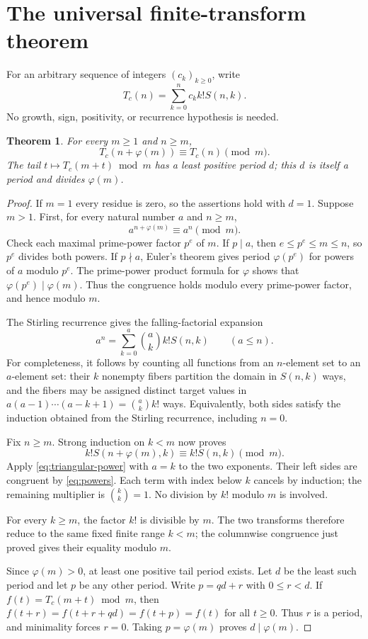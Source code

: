 \documentclass[11pt,a4paper]{article}
\newtheorem{theorem}{Theorem}[section]
\theoremstyle{remark}
\begin{document}
\section{The universal finite-transform theorem}
For an arbitrary sequence of integers $(c_k)_{k\ge0}$, write
\[
T_c(n)=\sum_{k=0}^n c_k k!S(n,k).
\]
No growth, sign, positivity, or recurrence hypothesis is needed.
\begin{theorem}\label{thm:period}
For every $m\ge1$ and $n\ge m$,
\[
T_c(n+\varphi(m))\equiv T_c(n)\pmod m.
\]
The tail $t\mapsto T_c(m+t)\bmod m$ has a least positive period $d$;
this $d$ is itself a period and divides $\varphi(m)$.
\end{theorem}
\begin{proof}
If $m=1$ every residue is zero, so the assertions hold with $d=1$.
Suppose $m>1$. First, for every natural number $a$ and $n\ge m$,
\begin{equation}\label{eq:powers}
a^{n+\varphi(m)}\equiv a^n\pmod m.
\end{equation}
Check each maximal prime-power factor $p^e$ of $m$. If $p\mid a$,
then $e\le p^e\le m\le n$, so $p^e$ divides both powers. If
$p\nmid a$, Euler's theorem gives period $\varphi(p^e)$ for powers
of $a$ modulo $p^e$. The prime-power product formula for $\varphi$
shows that $\varphi(p^e)\mid\varphi(m)$. Thus the congruence holds
modulo every prime-power factor, and hence modulo $m$.

The Stirling recurrence gives the falling-factorial expansion
\begin{equation}\label{eq:triangular-power}
a^n=\sum_{k=0}^{a}\binom ak k!S(n,k)\qquad(a\le n).
\end{equation}
For completeness, it follows by counting all functions from an
$n$-element set to an $a$-element set: their $k$ nonempty fibers
partition the domain in $S(n,k)$ ways, and the fibers may be assigned
distinct target values in $a(a-1)\cdots(a-k+1)=\binom ak k!$ ways.
Equivalently, both sides satisfy the induction obtained from the
Stirling recurrence, including $n=0$.

Fix $n\ge m$. Strong induction on $k<m$ now proves
\[
k!S(n+\varphi(m),k)\equiv k!S(n,k)\pmod m.
\]
Apply \eqref{eq:triangular-power} with $a=k$ to the two exponents.
Their left sides are congruent by \eqref{eq:powers}. Each term with
index below $k$ cancels by induction; the remaining multiplier is
$\binom kk=1$. No division by $k!$ modulo $m$ is involved.

For every $k\ge m$, the factor $k!$ is divisible by $m$. The two
transforms therefore reduce to the same fixed finite range $k<m$;
the columnwise congruence just proved gives their equality modulo $m$.

Since $\varphi(m)>0$, at least one positive tail period exists.
Let $d$ be the least such period and let $p$ be any other period.
Write $p=qd+r$ with $0\le r<d$. If $f(t)=T_c(m+t)\bmod m$, then
$f(t+r)=f(t+r+qd)=f(t+p)=f(t)$ for all $t\ge0$.
Thus $r$ is a period, and minimality forces $r=0$.
Taking $p=\varphi(m)$ proves $d\mid\varphi(m)$.
\end{proof}
\end{document}
